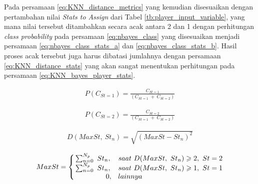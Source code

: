 Pada persamaan \ref{eq:KNN_distance_metrics} yang kemudian disesuaikan dengan pertambahan nilai \textit{Stats to Assign} dari Tabel \ref{tb:player_input_variable}, yang mana nilai tersebut ditambahkan secara acak antara 2 dan 1 dengan perhitungan \textit{class probability} pada persamaan \ref{eq:nbayes_class} yang disesuaikan menjadi persamaan \ref{eq:nbayes_class_stats_a} dan \ref{eq:nbayes_class_stats_b}. Hasil proses acak tersebut juga harus dibatasi jumlahnya dengan persamaan \ref{eq:KNN_distance_stats} yang akan sangat menentukan perhitungan pada persamaan \ref{eq:KNN_bayes_player_stats}.
\vspace{1ex}

\begin{equation}\label{eq:nbayes_class_stats_a}
\begin{split}
P(C_{St = 1}) = \frac{C_{St = 1}}{(C_{St = 1}\ +\ C_{St = 2})}
\end{split}
\end{equation}

\begin{equation}\label{eq:nbayes_class_stats_b}
\begin{split}
P(C_{St = 2}) = \frac{C_{St = 2}}{(C_{St = 1}\ +\ C_{St = 2})}
\end{split}
\end{equation}

\begin{equation}\label{eq:KNN_distance_stats}
\begin{split}
D(MaxSt,\ St_{n}) = \sqrt{(MaxSt - St_{n})^2}
\end{split}
\end{equation}

\begin{equation}\label{eq:KNN_bayes_player_stats}
\begin{split}
MaxSt = \left\{\begin{matrix}
\sum_{n = 0}^{N_{p}}\ St_{n}, & saat\ D(MaxSt,\ St_{n}) \geqslant 2,\ St = 2 \\ 
\sum_{n = 0}^{N_{p}}\ St_{n}, & saat\ D(MaxSt,\ St_{n}) \geqslant 1,\ St = 1 \\
\hspace{4.5em} 0, 		  & \hspace{-11.5em} lainnya
\end{matrix}\right.
\end{split}
\end{equation}

